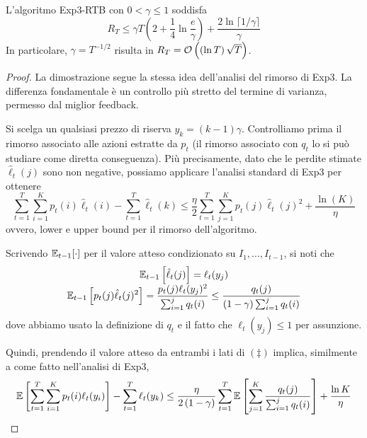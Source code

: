 \begin{theorem}
    L'algoritmo Exp3-RTB con $0 < \gamma \leq 1$ soddisfa 
    $$ R_T \leq \gamma T \left(2 + \frac{1}{4} \ln \frac{e}{\gamma} \right) + \frac{2 \ln \lceil 1/\gamma \rceil}{\gamma} $$
    In particolare, $\gamma = T^{-1/2}$ risulta in $R_T = \mathcal{O} \left(\left(\ln T\right) \sqrt{T}\right)$.
\end{theorem}
\begin{proof}
    La dimostrazione segue la stessa idea dell'analisi del rimorso di Exp3. La differenza fondamentale è un controllo più stretto del termine di varianza, permesso dal miglior feedback.
    
    Si scelga un qualsiasi prezzo di riserva $y_k =(k - 1) \gamma$. Controlliamo prima il rimorso associato alle azioni estratte da $p_t$ (il rimorso associato con $q_t$ lo si può studiare come diretta conseguenza). Più precisamente, dato che le perdite stimate $\hat \ell_t (j)$ sono non negative, possiamo applicare l'analisi standard di Exp3 per ottenere
    \[ \sum_{t = 1}^T \sum_{i = 1}^K p_t (i) \hat \ell_t (i) - \sum_{t = 1}^T \hat \ell_t (k) \leq \frac{\eta}{2} \sum_{t = 1}^T \sum_{j = 1}^K p_t (j) \hat \ell_t (j)^2 + \frac{\ln (K)}{\eta} \tag*{$(\ddag)$}\]
    ovvero, lower e upper bound per il rimorso dell'algoritmo.
    
    Scrivendo $\mathbb{E}_{t-1} [\cdot]$ per il valore atteso condizionato su $I_1, \dots, I_{t-1}$, si noti che
    $$
    \begin{array}{c}
        \displaystyle \mathbb{E}_{t-1} \left[\hat \ell_t (j)\right] = \ell_t (y_j) \\
        \displaystyle \mathbb{E}_{t-1} \left[p_t (j) \hat \ell_t (j)^2 \right] = \frac{p_t (j) \ell_t (y_j)^2}{\sum_{i = 1}^j q_t (i)} \leq \frac{q_t(j)}{(1 - \gamma) \sum_{i = 1}^j q_t (i)}
    \end{array}
    $$
    dove abbiamo usato la definizione di $q_t$ e il fatto che $\ell_t (y_j) \leq 1$ per assunzione. 
    
	Quindi, prendendo il valore atteso da entrambi i lati di $(\ddag)$ implica, similmente a come fatto nell'analisi di Exp3,
    $$ \mathbb{E} \left[\sum_{t = 1}^T \sum_{i = 1}^K p_t (i) \ell_t (y_i)\right] - \sum_{t = 1}^T \ell_t (y_k) \leq \frac{\eta}{2 \left(1 - \gamma\right)} \sum_{t = 1}^T \mathbb{E} \left[\sum_{j = 1}^K \frac{q_t (j)}{\sum_{i = 1}^j q_t (i)}\right] + \frac{\ln K}{\eta} $$
    

\end{proof}
